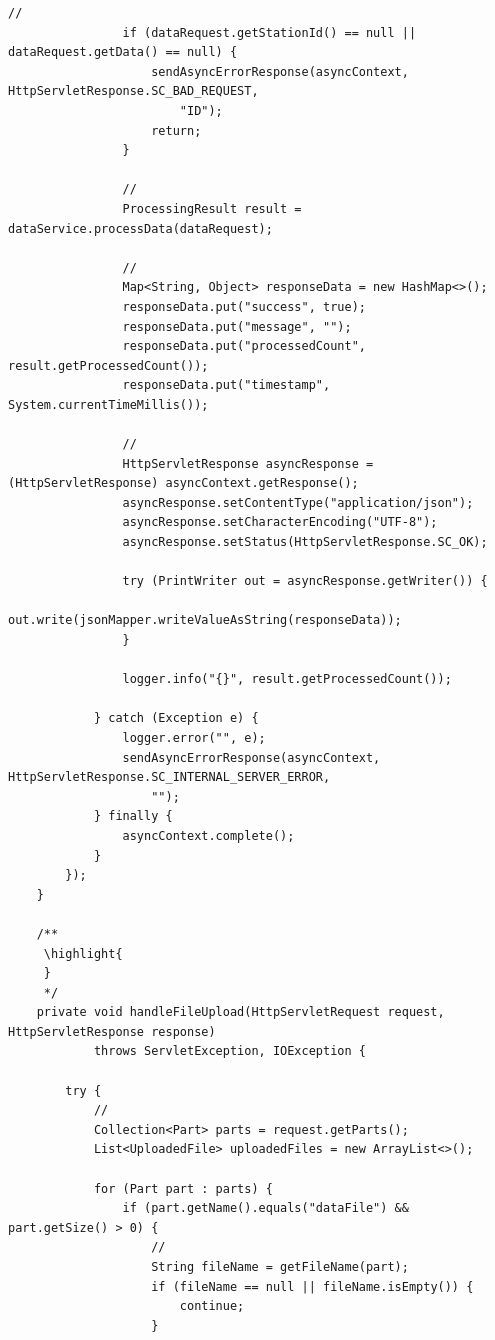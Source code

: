 \begin{lstlisting}[style=java]
                // 
                if (dataRequest.getStationId() == null || dataRequest.getData() == null) {
                    sendAsyncErrorResponse(asyncContext, HttpServletResponse.SC_BAD_REQUEST, 
                        "ID");
                    return;
                }
                
                // 
                ProcessingResult result = dataService.processData(dataRequest);
                
                // 
                Map<String, Object> responseData = new HashMap<>();
                responseData.put("success", true);
                responseData.put("message", "");
                responseData.put("processedCount", result.getProcessedCount());
                responseData.put("timestamp", System.currentTimeMillis());
                
                // 
                HttpServletResponse asyncResponse = (HttpServletResponse) asyncContext.getResponse();
                asyncResponse.setContentType("application/json");
                asyncResponse.setCharacterEncoding("UTF-8");
                asyncResponse.setStatus(HttpServletResponse.SC_OK);
                
                try (PrintWriter out = asyncResponse.getWriter()) {
                    out.write(jsonMapper.writeValueAsString(responseData));
                }
                
                logger.info("{}", result.getProcessedCount());
                
            } catch (Exception e) {
                logger.error("", e);
                sendAsyncErrorResponse(asyncContext, HttpServletResponse.SC_INTERNAL_SERVER_ERROR, 
                    "");
            } finally {
                asyncContext.complete();
            }
        });
    }
    
    /**
     \highlight{ 
     } 
     */
    private void handleFileUpload(HttpServletRequest request, HttpServletResponse response) 
            throws ServletException, IOException {
        
        try {
            // 
            Collection<Part> parts = request.getParts();
            List<UploadedFile> uploadedFiles = new ArrayList<>();
            
            for (Part part : parts) {
                if (part.getName().equals("dataFile") && part.getSize() > 0) {
                    // 
                    String fileName = getFileName(part);
                    if (fileName == null || fileName.isEmpty()) {
                        continue;
                    }
                    

\end{lstlisting}
